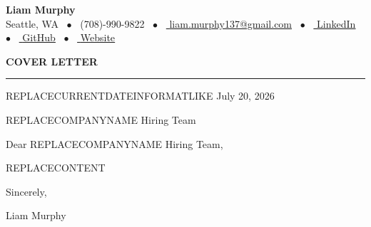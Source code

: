 \documentclass[10pt]{article}
\newcommand{\link}[2]{\href{#2}{\color{darkgray} \uline{#1}}}
\newcommand{\heading}[1]{{\Large \bfseries \color{primary} #1}}
\begin{document}
\begin{center}
    {\Huge \bfseries \color{primary} Liam Murphy} \\ \vspace{4pt}
    \small
    Seattle, WA \ $\bullet$ \
    (708)-990-9822 \ $\bullet$ \
    \link{liam.murphy137@gmail.com}{mailto:liam.murphy137@gmail.com} \ $\bullet$ \
    \link{LinkedIn}{https://www.linkedin.com/in/liammurphy14/} \ $\bullet$ \
    \link{GitHub}{https://github.com/liam-murphy14} \ $\bullet$ \
    \link{Website}{https://liammurphydev.com}
\end{center}

\vspace{12pt}

\heading{COVER LETTER}
\vspace{4pt}
\hrule
\vspace{12pt}

REPLACECURRENTDATEINFORMATLIKE July 20, 2026

REPLACECOMPANYNAME Hiring Team

Dear REPLACECOMPANYNAME Hiring Team,

REPLACECONTENT

Sincerely,

Liam Murphy
\end{document}

